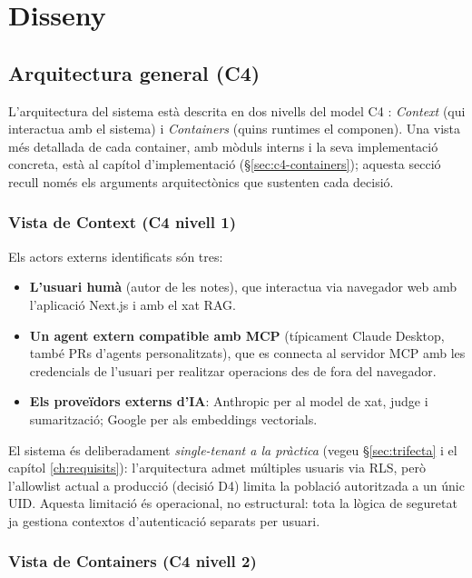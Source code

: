 \chapter{Disseny}
\label{ch:disseny}

\section{Arquitectura general (C4)}
\label{sec:arquitectura-c4-disseny}

L'arquitectura del sistema està descrita en dos nivells del model C4 \parencite{brown2018c4}: \emph{Context} (qui interactua amb el sistema) i \emph{Containers} (quins runtimes el componen). Una vista més detallada de cada container, amb mòduls interns i la seva implementació concreta, està al capítol d'implementació (\S\ref{sec:c4-containers}); aquesta secció recull només els arguments arquitectònics que sustenten cada decisió.

\subsection{Vista de Context (C4 nivell 1)}

Els actors externs identificats són tres:

\begin{itemize}
    \item \textbf{L'usuari humà} (autor de les notes), que interactua via navegador web amb l'aplicació Next.js i amb el xat RAG.
    \item \textbf{Un agent extern compatible amb MCP} (típicament Claude Desktop, també PRs d'agents personalitzats), que es connecta al servidor MCP amb les credencials de l'usuari per realitzar operacions des de fora del navegador.
    \item \textbf{Els proveïdors externs d'IA}: Anthropic per al model de xat, judge i sumarització; Google per als embeddings vectorials.
\end{itemize}

El sistema és deliberadament \emph{single-tenant a la pràctica} (vegeu \S\ref{sec:trifecta} i el capítol \ref{ch:requisits}): l'arquitectura admet múltiples usuaris via RLS, però l'allowlist actual a producció (decisió D4) limita la població autoritzada a un únic UID. Aquesta limitació és operacional, no estructural: tota la lògica de seguretat ja gestiona contextos d'autenticació separats per usuari.

\subsection{Vista de Containers (C4 nivell 2)}

